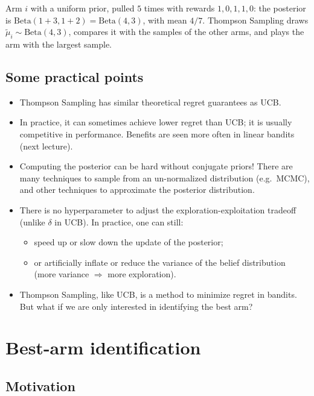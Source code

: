 \begin{remark}[Example]
Arm $i$ with a uniform prior, pulled $5$ times with rewards $1, 0, 1, 1, 0$: the posterior is $\text{Beta}(1 + 3, 1 + 2) = \text{Beta}(4, 3)$, with mean $4/7$. Thompson Sampling draws $\tilde{\mu}_i \sim \text{Beta}(4,3)$, compares it with the samples of the other arms, and plays the arm with the largest sample.
\end{remark}

\subsection{Some practical points}

\begin{itemize}
    \item Thompson Sampling has similar theoretical regret guarantees as UCB.
    \item In practice, it can sometimes achieve lower regret than UCB; it is usually competitive in performance. Benefits are seen more often in linear bandits (next lecture).
    \item Computing the posterior can be hard without conjugate priors! There are many techniques to sample from an un-normalized distribution (e.g.\ MCMC), and other techniques to approximate the posterior distribution.
    \item There is no hyperparameter to adjust the exploration-exploitation tradeoff (unlike $\delta$ in UCB). In practice, one can still:
    \begin{itemize}
        \item speed up or slow down the update of the posterior;
        \item or artificially inflate or reduce the variance of the belief distribution (more variance $\Rightarrow$ more exploration).
    \end{itemize}
    \item Thompson Sampling, like UCB, is a method to minimize regret in bandits. But what if we are only interested in identifying the best arm?
\end{itemize}

\section{Best-arm identification}

\subsection{Motivation}

